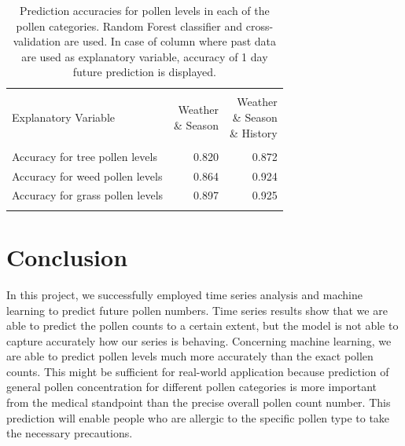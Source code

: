 \documentclass[a4paper,11pt]{article}
\begin{document}
\begin{table}
	\centering
	\begin{tabular}{lrr}
		\hline \\
		\vspace{0.6em}
		Explanatory Variable & \pbox{30cm}{Weather \\ \& Season} & \pbox{30cm}{Weather \\ \& Season \\ \& History}   \\
		\hline \\
		\vspace{0.2em}
		Accuracy for tree pollen levels & 0.820 & 0.872 \\ 
		\vspace{0.2em}
		Accuracy for weed pollen levels& 0.864 & 0.924 \\
		\vspace{0.2em}
	    Accuracy for grass pollen levels& 0.897  & 0.925  \\ \vspace{-0.4em} \\
		\hline
	\end{tabular}
	\caption{Prediction accuracies for pollen levels in each of the pollen categories. Random Forest classifier and cross-validation are used. In case of column where past data are used as explanatory variable, accuracy of 1 day future prediction is displayed.}
	\label{tab:category}
\end{table}


\section{Conclusion}
In this project, we successfully employed time series analysis and machine learning to predict future pollen numbers. Time series results show that we are able to predict the pollen counts to a certain extent, but the model is not able to capture accurately how our series is behaving. Concerning machine learning, we are able to predict pollen levels much more accurately than the exact pollen counts. This might be sufficient for real-world application because prediction of general pollen concentration for different pollen categories is more important from the medical standpoint than the precise overall pollen count number. This prediction will enable people who are allergic to the specific pollen type to take the necessary precautions. 
\end{document}
